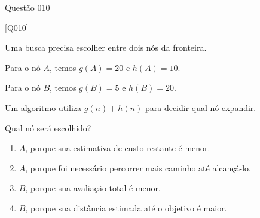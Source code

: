 \documentclass[xcolor=dvipsnames,table]{beamer}
\begin{document}
\begin{frame}{Questão 010}

    \begin{block}{[Q010]}

        Uma busca precisa escolher entre dois nós da fronteira.

        Para o nó $A$, temos $g(A)=20$ e $h(A)=10$.

        Para o nó $B$, temos $g(B)=5$ e $h(B)=20$.

        Um algoritmo utiliza $g(n)+h(n)$ para decidir qual nó expandir.

        Qual nó será escolhido?

    \end{block}

    \begin{enumerate}[label=(\Alph*)]

        \item $A$, porque sua estimativa de custo restante é menor.

        \item $A$, porque foi necessário percorrer mais caminho até alcançá-lo.

        \item $B$, porque sua avaliação total é menor.

        \item $B$, porque sua distância estimada até o objetivo é maior.

    \end{enumerate}

\end{frame}
\end{document}
